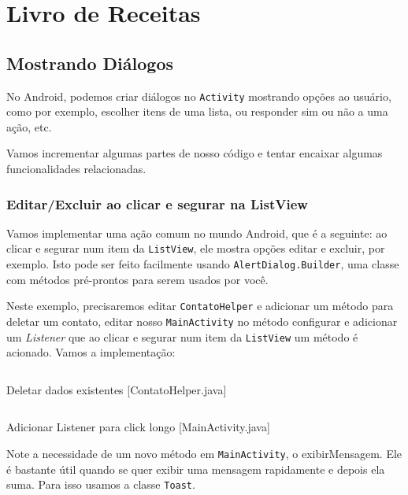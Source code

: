\chapter{Livro de Receitas}

\section{Mostrando Diálogos}

No Android, podemos criar diálogos no \texttt{Activity} mostrando opções
ao usuário, como por exemplo, escolher itens de uma lista, ou responder
sim ou não a uma ação, etc.

Vamos incrementar algumas partes de nosso código e tentar encaixar
algumas funcionalidades relacionadas.

\subsection{Editar/Excluir ao clicar e segurar na ListView}

Vamos implementar uma ação comum no mundo Android, que é a seguinte: ao
clicar e segurar num item da \texttt{ListView}, ele mostra opções editar
e excluir, por exemplo. Isto pode ser feito facilmente usando
\texttt{AlertDialog.Builder}, uma classe com métodos pré-prontos para
serem usados por você.

Neste exemplo, precisaremos editar \texttt{ContatoHelper} e adicionar um
método para deletar um contato, editar nosso \texttt{MainActivity} no
método configurar e adicionar um \emph{Listener} que ao clicar e segurar
num item da \texttt{ListView} um método é acionado. Vamos a
implementação:

\begin{listing}[H]
  \inputminted[linenos=true,frame=bottomline,tabsize=3]{ java }{ source/ContatoHelper-5.java }
  \caption{Deletar dados existentes [ContatoHelper.java]}
\end{listing}

\begin{listing}[H]
  \inputminted[linenos=true,frame=bottomline,tabsize=3]{ java }{ source/MainActivity-8.java }
  \caption{Adicionar Listener para click longo [MainActivity.java]}
\end{listing}

Note a necessidade de um novo método em \texttt{MainActivity}, o
exibirMensagem. Ele é bastante útil quando se quer exibir uma mensagem
rapidamente e depois ela suma. Para isso usamos a classe \texttt{Toast}.

